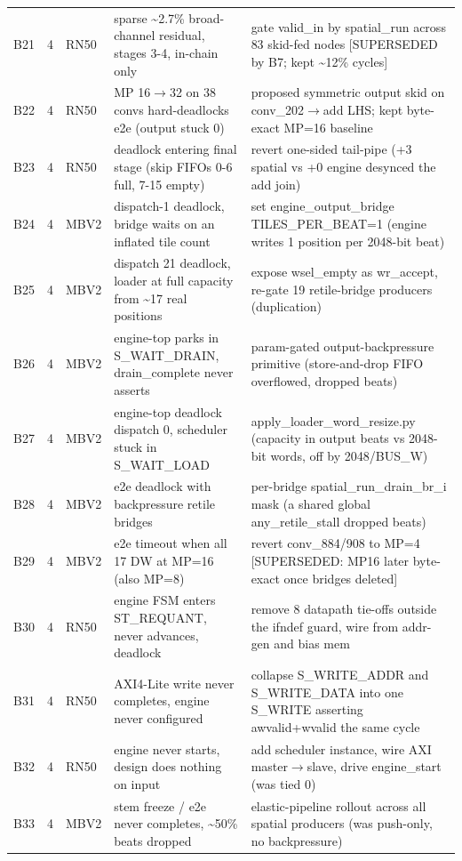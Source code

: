 \documentclass[acmtog,authorversion]{acmart}
\begin{document}
\begin{longtable}{@{}l l l p{} p{}@{}}
B21 & 4 & RN50 & sparse \textasciitilde{}2.7\% broad-channel residual, stages 3-4, in-chain only & gate valid\_in by spatial\_run across 83 skid-fed nodes [SUPERSEDED by B7; kept \textasciitilde{}12\% cycles] \\
B22 & 4 & RN50 & MP 16$\rightarrow$32 on 38 convs hard-deadlocks e2e (output stuck 0) & proposed symmetric output skid on conv\_202$\rightarrow$add LHS; kept byte-exact MP=16 baseline \\
B23 & 4 & RN50 & deadlock entering final stage (skip FIFOs 0-6 full, 7-15 empty) & revert one-sided tail-pipe (+3 spatial vs +0 engine desynced the add join) \\
B24 & 4 & MBV2 & dispatch-1 deadlock, bridge waits on an inflated tile count & set engine\_output\_bridge TILES\_PER\_BEAT=1 (engine writes 1 position per 2048-bit beat) \\
B25 & 4 & MBV2 & dispatch 21 deadlock, loader at full capacity from \textasciitilde{}17 real positions & expose wsel\_empty as wr\_accept, re-gate 19 retile-bridge producers (duplication) \\
B26 & 4 & MBV2 & engine-top parks in S\_WAIT\_DRAIN, drain\_complete never asserts & param-gated output-backpressure primitive (store-and-drop FIFO overflowed, dropped beats) \\
B27 & 4 & MBV2 & engine-top deadlock dispatch 0, scheduler stuck in S\_WAIT\_LOAD & apply\_loader\_word\_resize.py (capacity in output beats vs 2048-bit words, off by 2048/BUS\_W) \\
B28 & 4 & MBV2 & e2e deadlock with backpressure retile bridges & per-bridge spatial\_run\_drain\_br\_i mask (a shared global any\_retile\_stall dropped beats) \\
B29 & 4 & MBV2 & e2e timeout when all 17 DW at MP=16 (also MP=8) & revert conv\_884/908 to MP=4 [SUPERSEDED: MP16 later byte-exact once bridges deleted] \\
B30 & 4 & RN50 & engine FSM enters ST\_REQUANT, never advances, deadlock & remove 8 datapath tie-offs outside the ifndef guard, wire from addr-gen and bias mem \\
B31 & 4 & RN50 & AXI4-Lite write never completes, engine never configured & collapse S\_WRITE\_ADDR and S\_WRITE\_DATA into one S\_WRITE asserting awvalid+wvalid the same cycle \\
B32 & 4 & RN50 & engine never starts, design does nothing on input & add scheduler instance, wire AXI master$\rightarrow$slave, drive engine\_start (was tied 0) \\
B33 & 4 & MBV2 & stem freeze / e2e never completes, \textasciitilde{}50\% beats dropped & elastic-pipeline rollout across all spatial producers (was push-only, no backpressure) \\

\end{longtable}
\end{document}

